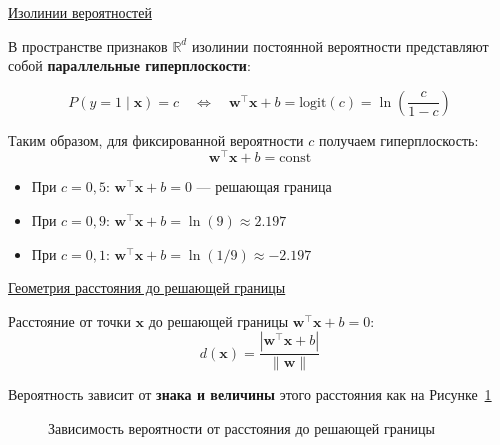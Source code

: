 \underline{Изолинии вероятностей}

В пространстве признаков $\mathbb{R}^d$ изолинии постоянной вероятности представляют собой \textbf{параллельные
гиперплоскости}:

\[ P(y=1 \mid \bm{x}) = c \quad \Leftrightarrow \quad \bm{w}^\top \bm{x} + b = \text{logit}(c) =
\ln\left(\frac{c}{1-c}\right) \]

Таким образом, для фиксированной вероятности $c$ получаем гиперплоскость:
\[ \bm{w}^\top \bm{x} + b = \text{const} \]

\begin{itemize}
    \item При $c = 0,5$: $\bm{w}^\top \bm{x} + b = 0$ --- решающая граница
    \item При $c = 0,9$: $\bm{w}^\top \bm{x} + b = \ln(9) \approx 2.197$
    \item При $c = 0,1$: $\bm{w}^\top \bm{x} + b = \ln(1/9) \approx -2.197$
\end{itemize}

\underline{Геометрия расстояния до решающей границы}

Расстояние от точки $\bm{x}$ до решающей границы $\bm{w}^\top \bm{x} + b = 0$:
\[ d(\bm{x}) = \frac{|\bm{w}^\top \bm{x} + b|}{\|\bm{w}\|} \]

Вероятность зависит от \textbf{знака и величины} этого расстояния как на Рисунке~\ref{fig:pd}

\begin{figure}[h]
    \centering
    \caption{Зависимость вероятности от расстояния до решающей границы}
    \label{fig:pd}
\end{figure}

